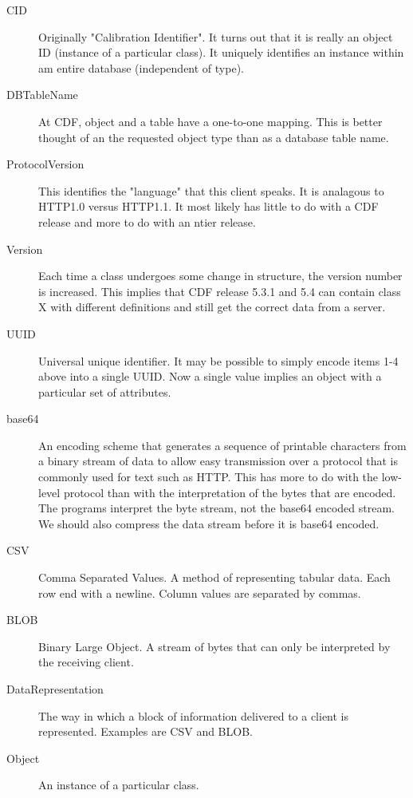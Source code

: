 \begin{description}
\item[CID]

Originally "Calibration Identifier".  It turns
out that it is really an
object ID (instance of a particular class).  It uniquely identifies an
instance within am entire database (independent of type).

\item[DBTableName]

At CDF, object and a table have a one-to-one mapping.  This is
better thought of an the requested object type than as a 
database table name. 

\item[ProtocolVersion]

This identifies the "language" that this client speaks.  It
is analagous to HTTP1.0 versus HTTP1.1.  It most likely has
little to do with a CDF release and more to do with an
ntier release.

\item[Version]

Each time a class undergoes some change in structure, the version
number is increased.  This implies that CDF release 5.3.1 and 5.4
can contain class X with different definitions and still get the
correct data from a server.

\item[UUID]

Universal unique identifier. It may be possible to simply 
encode items 1-4 above into a single UUID. Now a single value implies 
an object with a particular set of attributes.

\item[base64]

An encoding scheme that generates a sequence of printable
characters from a binary stream of data to allow easy transmission over
a protocol that is commonly used for text such as HTTP.  This has more to
do with the low-level protocol than with the interpretation of the bytes
that are encoded.  The programs interpret the byte stream, not the 
base64 encoded stream.  We should also compress the data stream before
it is base64 encoded.

\item[CSV]

Comma Separated Values.  A method of representing tabular data.
Each row end with a newline.  Column values are separated by commas.

\item[BLOB]

Binary Large Object.  A stream of bytes that can only be
interpreted by the receiving client.

\item[DataRepresentation]

The way in which a block of
information delivered to a client is represented.
Examples are CSV and BLOB.

\item[Object]

An instance of a particular class.

\end{description}
